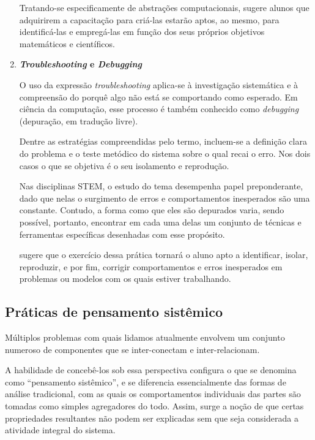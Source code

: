 \begin{enumerate}
  Tratando-se especificamente de abstrações computacionais,  sugere alunos que adquirirem a capacitação para criá-las estarão aptos, ao mesmo, para identificá-las e empregá-las em função dos seus próprios objetivos matemáticos e científicos. 

  \item \textbf{\textit{Troubleshooting} e \textit{Debugging}} 
  
  O uso da expressão \textit{troubleshooting} aplica-se à investigação sistemática e à compreensão do porquê algo não está se comportando como esperado. 
  Em ciência da computação, esse processo é também conhecido como \textit{debugging} (depuração, em tradução livre). 

  Dentre as estratégias compreendidas pelo termo, incluem-se a definição clara do problema e o teste metódico do sistema sobre o qual recai o erro. Nos dois casos o que se objetiva é o seu isolamento e reprodução.

  Nas disciplinas STEM, o estudo do tema desempenha papel preponderante, dado que nelas o surgimento de erros e comportamentos inesperados são uma constante. Contudo, a forma como que eles são depurados varia, sendo possível, portanto, encontrar em cada uma delas um conjunto de técnicas e ferramentas específicas desenhadas com esse propósito. 

   sugere que o exercício dessa prática tornará o aluno apto a identificar, isolar, reproduzir, e por fim, corrigir comportamentos e erros inesperados em problemas ou modelos com os quais estiver trabalhando.
\end{enumerate}

\subsection{Práticas de pensamento sistêmico}\label{sub-sec:pensamento-sistemico}

Múltiplos problemas com quais lidamos atualmente envolvem um conjunto numeroso de componentes que se inter-conectam e inter-relacionam. 

A habilidade de concebê-los sob essa perspectiva configura o que se denomina como ``pensamento sistêmico'', e se diferencia essencialmente das formas de análise tradicional, com as quais os comportamentos individuais das partes são tomadas como simples agregadores do todo. Assim, surge a noção de que certas propriedades resultantes não podem ser explicadas sem que seja considerada a atividade integral do sistema. 

